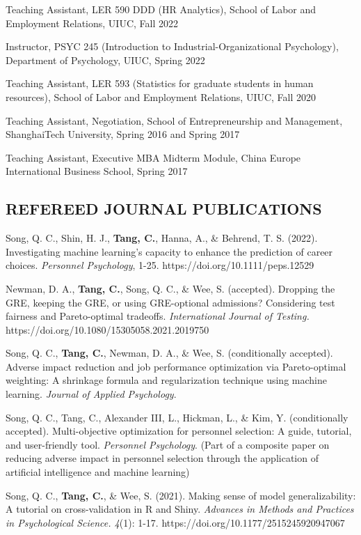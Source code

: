 \documentclass[
  20,
]{article}
\begin{document}
Teaching Assistant, LER 590 DDD (HR Analytics), School of Labor and
Employment Relations, UIUC, Fall 2022

Instructor, PSYC 245 (Introduction to Industrial-Organizational
Psychology), Department of Psychology, UIUC, Spring 2022

Teaching Assistant, LER 593 (Statistics for graduate students in human
resources), School of Labor and Employment Relations, UIUC, Fall 2020

Teaching Assistant, Negotiation, School of Entrepreneurship and
Management, ShanghaiTech University, Spring 2016 and Spring 2017

Teaching Assistant, Executive MBA Midterm Module, China Europe
International Business School, Spring 2017

\newpage

\hypertarget{refereed-journal-publications}{%
\subsection{\texorpdfstring{\textbf{REFEREED JOURNAL
PUBLICATIONS}}{REFEREED JOURNAL PUBLICATIONS}}\label{refereed-journal-publications}}

Song, Q. C., Shin, H. J., \textbf{Tang, C.}, Hanna, A., \& Behrend, T.
S. (2022). Investigating machine learning's capacity to enhance the
prediction of career choices. \emph{Personnel Psychology}, 1-25.
https://doi.org/10.1111/peps.12529

Newman, D. A., \textbf{Tang, C.}, Song, Q. C., \& Wee, S. (accepted).
Dropping the GRE, keeping the GRE, or using GRE-optional admissions?
Considering test fairness and Pareto-optimal tradeoffs.
\emph{International Journal of Testing.}
https://doi.org/10.1080/15305058.2021.2019750

Song, Q. C., \textbf{Tang, C.}, Newman, D. A., \& Wee, S. (conditionally
accepted). Adverse impact reduction and job performance optimization via
Pareto-optimal weighting: A shrinkage formula and regularization
technique using machine learning. \emph{Journal of Applied Psychology}.

Song, Q. C., Tang, C., Alexander III, L., Hickman, L., \& Kim, Y.
(conditionally accepted). Multi-objective optimization for personnel
selection: A guide, tutorial, and user-friendly tool. \emph{Personnel
Psychology}. (Part of a composite paper on reducing adverse impact in
personnel selection through the application of artificial intelligence
and machine learning)

Song, Q. C., \textbf{Tang, C.}, \& Wee, S. (2021). Making sense of model
generalizability: A tutorial on cross-validation in R and Shiny.
\emph{Advances in Methods and Practices in Psychological Science. 4}(1):
1-17. https://doi.org/10.1177/2515245920947067
\end{document}
